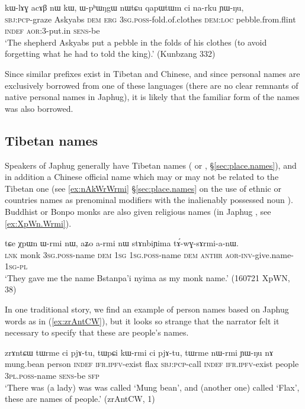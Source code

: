  \begin{exe}
\ex \label{ex:kWlAGacAB.nW.kW}
\gll kɯ-lɤɣ acɤβ nɯ kɯ, ɯ-pʰɯŋgɯ nɯtɕu qapɯtɯm ci na-rku ɲɯ-ŋu, \\
\textsc{sbj}:\textsc{pcp}-graze Askyabs \textsc{dem} \textsc{erg} \textsc{3sg}.\textsc{poss}-fold.of.clothes \textsc{dem}:\textsc{loc} pebble.from.flint \textsc{indef} \textsc{aor}:3\flobv{}-put.in \textsc{sens}-be \\
\glt `The shepherd Askyabs put a pebble in the folds of his clothes (to avoid forgetting what he had to told the king).'  (Kunbzang 332)
\end{exe}

Since similar  prefixes exist in Tibetan and Chinese, and since personal names are exclusively borrowed from one of these languages (there are no clear remnants of native personal names in Japhug), it is likely that the familiar form of the names was also borrowed.

\subsection{Tibetan names} \label{sec:names.tibet}
Speakers of Japhug generally have Tibetan names ( or , §\ref{sec:place.names}), and in addition a Chinese official name which may or may not be related to the Tibetan one (see \ref{ex:nAkWrWrmi} §\ref{sec:place.names} on the use of ethnic or countries names as prenominal modifiers with the inalienably possessed noun ). Buddhist or Bonpo monks are also given religious names (in Japhug , see \ref{ex:XpWn.Wrmi}). 
 
\begin{exe}
\ex \label{ex:XpWn.Wrmi}
\gll tɕe χpɯn ɯ-rmi nɯ, aʑo a-rmi nɯ stɤnbiɲima tɤ́-wɣ-sɤrmi-a-nɯ. \\
\textsc{lnk} monk \textsc{3sg}.\textsc{poss}-name \textsc{dem} \textsc{1sg} \textsc{1sg}.\textsc{poss}-name \textsc{dem}  \textsc{anthr} \textsc{aor}-\textsc{inv}-give.name-\textsc{1sg}-\textsc{pl} \\
\glt `They gave me the name Bstanpa'i nyima as my monk name.' (160721 XpWN, 38)
\end{exe}

In one traditional story, we find an example of person names based on Japhug words as in (\ref{ex:zrAntCW}), but it looks so strange that the narrator felt it necessary to specify that these are people's names.

\begin{exe}
\ex  \label{ex:zrAntCW}
 \gll zrɤntɕɯ tɯrme ci pjɤ-tu, tɯpɕi kɯ-rmi ci pjɤ-tu, tɯrme nɯ-rmi ɲɯ-ŋu nɤ \\
mung.bean person \textsc{indef} \textsc{ifr}.\textsc{ipfv}-exist flax \textsc{sbj}:\textsc{pcp}-call  \textsc{indef} \textsc{ifr}.\textsc{ipfv}-exist people  \textsc{3pl}.\textsc{poss}-name \textsc{sens}-be \textsc{sfp} \\
\glt `There was (a lady) was was called `Mung bean', and (another one) called `Flax', these are names of people.' (zrAntCW, 1)
\end{exe}

